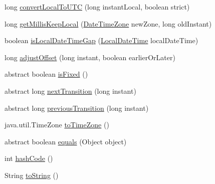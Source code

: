 \begin{DoxyCompactItemize}
\item 
long \hyperlink{classorg_1_1joda_1_1time_1_1_date_time_zone_a022408d4815687e0cff23b8935c790ea}{convert\-Local\-To\-U\-T\-C} (long instant\-Local, boolean strict)
\item 
long \hyperlink{classorg_1_1joda_1_1time_1_1_date_time_zone_ae884940a4cd3986cd66ec5b0531a8189}{get\-Millis\-Keep\-Local} (\hyperlink{classorg_1_1joda_1_1time_1_1_date_time_zone}{Date\-Time\-Zone} new\-Zone, long old\-Instant)
\item 
boolean \hyperlink{classorg_1_1joda_1_1time_1_1_date_time_zone_a69eb38f0d0e8d6803e594b50c5c9bd10}{is\-Local\-Date\-Time\-Gap} (\hyperlink{classorg_1_1joda_1_1time_1_1_local_date_time}{Local\-Date\-Time} local\-Date\-Time)
\item 
long \hyperlink{classorg_1_1joda_1_1time_1_1_date_time_zone_a6bb58fda5105ababa7f941d969cafd89}{adjust\-Offset} (long instant, boolean earlier\-Or\-Later)
\item 
abstract boolean \hyperlink{classorg_1_1joda_1_1time_1_1_date_time_zone_a35123b8c29580ae7f5053f02e64c991c}{is\-Fixed} ()
\item 
abstract long \hyperlink{classorg_1_1joda_1_1time_1_1_date_time_zone_ae251b0063d7a4359f7416d83a1ac39af}{next\-Transition} (long instant)
\item 
abstract long \hyperlink{classorg_1_1joda_1_1time_1_1_date_time_zone_abdb3c6d6191fdd441248a7ea8ca302d0}{previous\-Transition} (long instant)
\item 
java.\-util.\-Time\-Zone \hyperlink{classorg_1_1joda_1_1time_1_1_date_time_zone_a18f46617dc51f706feb99dc35c68f069}{to\-Time\-Zone} ()
\item 
abstract boolean \hyperlink{classorg_1_1joda_1_1time_1_1_date_time_zone_a6288bd96e3114aa213cc9c5fe63e9925}{equals} (Object object)
\item 
int \hyperlink{classorg_1_1joda_1_1time_1_1_date_time_zone_a8504ae94bffc634c5c5309554fd0cc9e}{hash\-Code} ()
\item 
String \hyperlink{classorg_1_1joda_1_1time_1_1_date_time_zone_accedad9b10c657cea86f89e1a9906218}{to\-String} ()
\end{DoxyCompactItemize}
